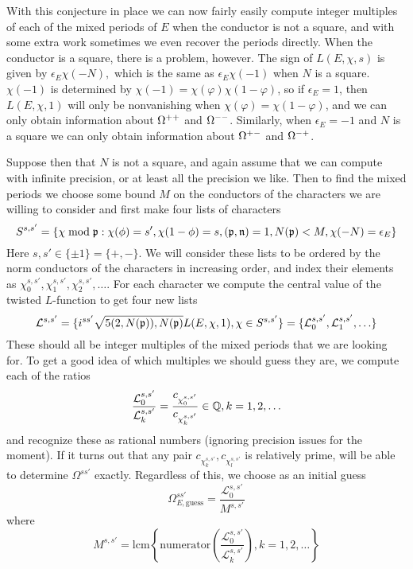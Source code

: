 With this conjecture in place we can now fairly easily compute integer multiples of each of the mixed periods of
$E$ when the conductor is not a square, and with some extra work sometimes we even recover the periods directly.
When the conductor is a square, there is a problem, however. The sign of $L(E, \chi, s)$ is given by
$\epsilon_E \chi(-N),$ which is the same as $\epsilon_E \chi(-1)$ when $N$ is a square. $\chi(-1)$ is determined
by $\chi(-1) = \chi(\varphi)\chi(1 - \varphi)$, so if $\epsilon_E = 1$, then $L(E, \chi, 1)$ will only be 
nonvanishing when $\chi(\varphi) = \chi(1 - \varphi)$, and we can only obtain information about $\Omega^{++}$ and
$\Omega^{--}$. Similarly, when $\epsilon_E = -1$ and $N$ is a square we can only obtain information about
$\Omega^{+-}$ and $\Omega^{-+}$.

Suppose then that $N$ is not a square, and again assume that we can compute with infinite precision, or
at least all the precision we like. Then to find the mixed periods we choose some bound $M$ on the conductors
of the characters we are willing to consider and first make four lists of characters
\[
    S^{s,s'} = \{ \chi \bmod \mathfrak{p} : \chi(\phi) = s', \chi(1 - \phi) = s, (\mathfrak{p}, \mathfrak{n}) = 1, N(\mathfrak{p}) < M, \chi(-N) = \epsilon_E\}
\]
Here $s, s' \in \{\pm 1\} = \{+, -\}$. We will consider these lists to be ordered by the norm conductors of the
characters in increasing order, and index their elements as $\chi^{s,s'}_0, \chi^{s,s'}_1, \chi^{s,s'}_2, \ldots$.
For each character we compute the central value of the twisted $L$-function to get four new lists
\[
    \mathcal{L}^{s,s'} = \{ i^{ss'}\sqrt{5 (2, N(\mathfrak{p})), N(\mathfrak{p})} L(E,\chi,1), \chi \in S^{s,s'}\} =
        \{\mathcal{L}^{s,s'}_0, \mathcal{L}^{s,s'}_1, \ldots\}
\]
These should all be integer multiples of the mixed periods that we are looking for. To get a good idea of which
multiples we should guess they are, we compute each of the ratios
\[
    \frac{\mathcal{L}^{s,s'}_0}{\mathcal{L}^{s,s'}_k} = \frac{c_{\chi^{s,s'}_0}}{c_{\chi^{s,s'}_k}} \in \mathbb{Q}, k = 1, 2, \ldots
\]
and recognize these as rational numbers (ignoring precision issues for the moment). If it turns out that
any pair $c_{\chi^{s,s'}_k},c_{\chi^{s,s'}_l}$ is relatively prime, will be able to determine $\Omega^{ss'}$
exactly. Regardless of this, we choose as an initial guess
\[
    \Omega^{ss'}_{E, \mathrm{guess}} = \frac{\mathcal{L}^{s,s'}_0}{M^{s,s'}}
\]
where
\[
    M^{s,s'} = \mathrm{lcm}\left\{ \mathrm{numerator}\left(\frac{\mathcal{L}^{s,s'}_0}{\mathcal{L}^{s,s'}_k}\right),
        k = 1,2, \ldots \right\}
\]

